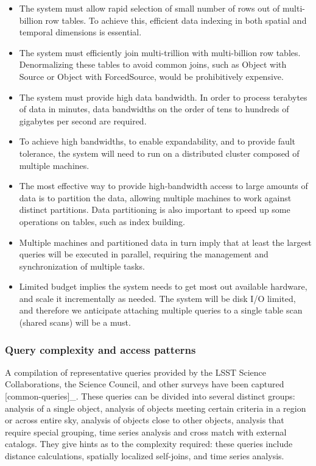 \documentclass[DM,lsstdraft,toc]{lsstdoc}
\begin{document}
\begin{itemize}
\item
  The system must allow rapid selection of small number of rows out of
  multi-billion row tables. To achieve this, efficient data indexing in
  both spatial and temporal dimensions is essential.
\item
  The system must efficiently join multi-trillion with multi-billion row
  tables. Denormalizing these tables to avoid common joins, such as
  Object with Source or Object with ForcedSource, would be prohibitively
  expensive.
\item
  The system must provide high data bandwidth. In order to process
  terabytes of data in minutes, data bandwidths on the order of tens to
  hundreds of gigabytes per second are required.
\item
  To achieve high bandwidths, to enable expandability, and to provide
  fault tolerance, the system will need to run on a distributed cluster
  composed of multiple machines.
\item
  The most effective way to provide high-bandwidth access to large
  amounts of data is to partition the data, allowing multiple machines
  to work against distinct partitions. Data partitioning is also
  important to speed up some operations on tables, such as index
  building.
\item
  Multiple machines and partitioned data in turn imply that at least the
  largest queries will be executed in parallel, requiring the management
  and synchronization of multiple tasks.
\item
  Limited budget implies the system needs to get most out available
  hardware, and scale it incrementally as needed. The system will be
  disk I/O limited, and therefore we anticipate attaching multiple
  queries to a single table scan (shared scans) will be a must.
\end{itemize}

\subsubsection{Query complexity and access
patterns}\label{query-complexity-and-access-patterns}

A compilation of representative queries provided by the LSST Science
Collaborations, the Science Council, and other surveys have been
captured {[}common-queries{]}\_. These queries can be divided into
several distinct groups: analysis of a single object, analysis of
objects meeting certain criteria in a region or across entire sky,
analysis of objects close to other objects, analysis that require
special grouping, time series analysis and cross match with external
catalogs. They give hints as to the complexity required: these queries
include distance calculations, spatially localized self-joins, and time
series analysis.
\end{document}
